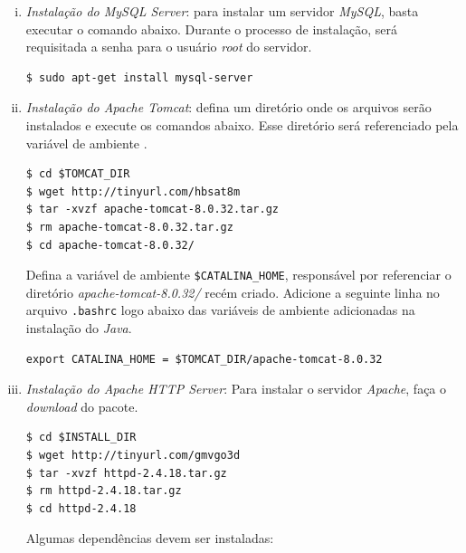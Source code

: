 \begin {enumerate}[i.]
\begin{lstlisting}[keywordstyle=\ttfamily, style=nonumbers]
export JAVA_HOME="/usr/lib/jvm/java-8-openjdk-amd64"
export JRE_HOME="/usr/lib/jvm/java-8-openjdk-amd64/jre"
\end{lstlisting}

\item \textit{Instalação do MySQL Server}: para instalar um servidor
\textit{MySQL}, basta executar o comando abaixo. Durante o processo de
instalação, será requisitada a senha para o usuário \textit{root} do servidor. 
\begin{lstlisting}[keywordstyle=\ttfamily, style=nonumbers]
$ sudo apt-get install mysql-server
\end{lstlisting}

\item \textit{Instalação do Apache Tomcat}: defina um diretório onde os arquivos
serão instalados e execute os comandos abaixo. Esse diretório será referenciado
pela variável de ambiente .

\begin{lstlisting}[keywordstyle=\ttfamily, style=nonumbers]
$ cd $TOMCAT_DIR
$ wget http://tinyurl.com/hbsat8m
$ tar -xvzf apache-tomcat-8.0.32.tar.gz
$ rm apache-tomcat-8.0.32.tar.gz
$ cd apache-tomcat-8.0.32/
\end{lstlisting}

Defina a variável de ambiente \texttt{\$CATALINA\_HOME}, responsável por
referenciar o diretório \textit{apache-tomcat-8.0.32/} recém criado. Adicione a
seguinte linha no arquivo \texttt{.bashrc} logo abaixo das variáveis de ambiente
adicionadas na instalação do \textit{Java}.

\begin{lstlisting}[keywordstyle=\ttfamily, style=nonumbers]
export CATALINA_HOME = $TOMCAT_DIR/apache-tomcat-8.0.32
\end{lstlisting}

\item \textit{Instalação do Apache HTTP Server}: Para instalar o servidor
\textit{Apache}, faça o \textit{download} do pacote. 

\begin{lstlisting}[keywordstyle=\ttfamily, style=nonumbers]
$ cd $INSTALL_DIR
$ wget http://tinyurl.com/gmvgo3d
$ tar -xvzf httpd-2.4.18.tar.gz
$ rm httpd-2.4.18.tar.gz
$ cd httpd-2.4.18
\end{lstlisting}

Algumas dependências devem ser instaladas:


\end{enumerate}
